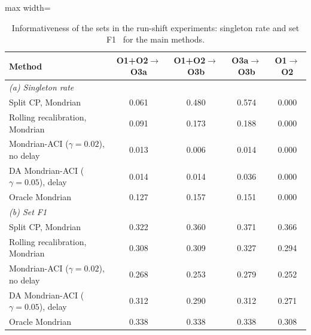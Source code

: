 \begin{table}[!htb]
\caption{Informativeness of the sets in the run-shift experiments: singleton rate and set F1~\cite{malz2025} for the main methods.}\label{tab:e2info}
\centering\scriptsize\setlength{\tabcolsep}{4pt}
\begin{adjustbox}{max width=\columnwidth}\begin{tabular}{lcccc}\toprule
Method & O1+O2$\rightarrow$O3a & O1+O2$\rightarrow$O3b & O3a$\rightarrow$O3b & O1$\rightarrow$O2\\\midrule
\multicolumn{5}{l}{\emph{(a) Singleton rate}}\\
Split CP, Mondrian & 0.061 & 0.480 & 0.574 & 0.000\\
Rolling recalibration, Mondrian & 0.091 & 0.173 & 0.188 & 0.000\\
Mondrian-ACI ($\gamma=0.02$), no delay & 0.013 & 0.006 & 0.014 & 0.000\\
DA Mondrian-ACI ($\gamma=0.05$), delay & 0.014 & 0.014 & 0.036 & 0.000\\
Oracle Mondrian & 0.127 & 0.157 & 0.151 & 0.000\\
\midrule
\multicolumn{5}{l}{\emph{(b) Set F1}}\\
Split CP, Mondrian & 0.322 & 0.360 & 0.371 & 0.366\\
Rolling recalibration, Mondrian & 0.308 & 0.309 & 0.327 & 0.294\\
Mondrian-ACI ($\gamma=0.02$), no delay & 0.268 & 0.253 & 0.279 & 0.252\\
DA Mondrian-ACI ($\gamma=0.05$), delay & 0.312 & 0.290 & 0.312 & 0.271\\
Oracle Mondrian & 0.338 & 0.338 & 0.338 & 0.308\\
\bottomrule
\end{tabular}\end{adjustbox}
\end{table}
